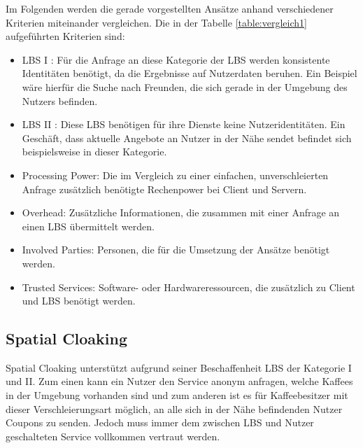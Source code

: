 Im Folgenden werden die gerade vorgestellten Ansätze anhand verschiedener Kriterien miteinander vergleichen. Die in der Tabelle \ref{table:vergleich1} aufgeführten Kriterien sind:
\begin{itemize}
	\item LBS I \cite{Chow2011}: Für die Anfrage an diese Kategorie der LBS werden konsistente Identitäten benötigt, da die Ergebnisse auf Nutzerdaten beruhen. Ein Beispiel wäre hierfür die Suche nach Freunden, die sich gerade in der Umgebung des Nutzers befinden.
	\item LBS II \cite{Chow2011}: Diese LBS benötigen für ihre Dienste keine Nutzeridentitäten. Ein Geschäft, dass aktuelle Angebote an Nutzer in der Nähe sendet befindet sich beispielsweise in dieser Kategorie.
	\item Processing Power: Die im Vergleich zu einer einfachen, unverschleierten Anfrage zusätzlich benötigte Rechenpower bei Client und Servern.
	\item Overhead: Zusätzliche Informationen, die zusammen mit einer Anfrage an einen LBS übermittelt werden.
	\item Involved Parties: Personen, die für die Umsetzung der Ansätze benötigt werden.
	\item Trusted Services: Software- oder Hardwareressourcen, die zusätzlich zu Client und LBS benötigt werden.
\end{itemize}

\subsection{Spatial Cloaking}
Spatial Cloaking unterstützt aufgrund seiner Beschaffenheit LBS der Kategorie I und II. Zum einen kann ein Nutzer den Service anonym anfragen, welche Kaffees in der Umgebung vorhanden sind und zum anderen ist es für Kaffeebesitzer mit dieser Verschleierungsart möglich, an alle sich in der Nähe befindenden Nutzer Coupons zu senden. Jedoch muss immer dem zwischen LBS und Nutzer geschalteten Service vollkommen vertraut werden.

